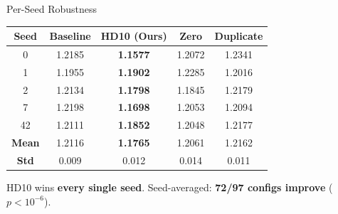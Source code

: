 \documentclass[aspectratio=169,11pt]{beamer}
\begin{document}
\begin{frame}{Per-Seed Robustness}

\begin{table}
\centering
\footnotesize
\begin{tabular}{ccccc}
\toprule
\textbf{Seed} & \textbf{Baseline} & \textbf{HD10 (Ours)} & \textbf{Zero} & \textbf{Duplicate} \\
\midrule
0 & 1.2185 & \textcolor{improve}{\textbf{1.1577}} & 1.2072 & 1.2341 \\
1 & 1.1955 & \textcolor{improve}{\textbf{1.1902}} & 1.2285 & 1.2016 \\
2 & 1.2134 & \textcolor{improve}{\textbf{1.1798}} & 1.1845 & 1.2179 \\
7 & 1.2198 & \textcolor{improve}{\textbf{1.1698}} & 1.2053 & 1.2094 \\
42 & 1.2111 & \textcolor{improve}{\textbf{1.1852}} & 1.2048 & 1.2177 \\
\midrule
\textbf{Mean} & 1.2116 & \textcolor{improve}{\textbf{1.1765}} & 1.2061 & 1.2162 \\
\textbf{Std} & 0.009 & 0.012 & 0.014 & 0.011 \\
\bottomrule
\end{tabular}
\end{table}

\medskip
\centering
HD10 wins \textbf{every single seed}. Seed-averaged: \textbf{72/97 configs improve} ($p < 10^{-6}$).

\end{frame}
\end{document}
